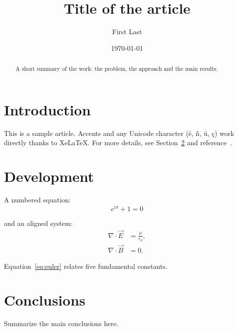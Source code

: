 \documentclass[11pt,a4paper]{article}
\title{Title of the article}
\author{First Last}
\date{\today}
\begin{document}
\maketitle

\begin{abstract}
  A short summary of the work: the problem, the approach and the main results.
\end{abstract}

\section{Introduction}
\label{sec:introduction}

This is a sample article. Accents and any Unicode character (é, ñ, ü, ç) work directly
thanks to XeLaTeX. For more details, see Section~\ref{sec:development} and
reference~\cite{knuth1984}.

\section{Development}
\label{sec:development}

A numbered equation:
\begin{equation}
  \label{eq:euler}
  e^{i\pi} + 1 = 0
\end{equation}

and an aligned system:
\begin{align}
  \nabla \cdot \vec{E} &= \frac{\rho}{\varepsilon_0}, \\
  \nabla \cdot \vec{B} &= 0.
\end{align}

Equation~\eqref{eq:euler} relates five fundamental constants.

\section{Conclusions}

Summarize the main conclusions here.



\end{document}
